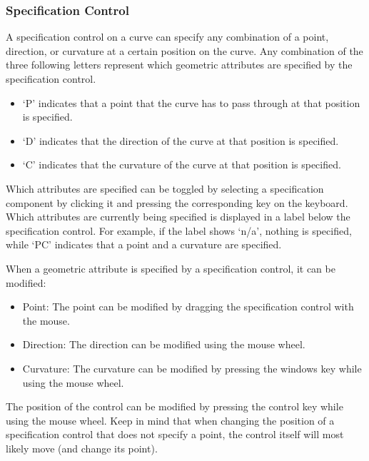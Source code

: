 \documentclass[a4paper]{article}
\begin{document}
				\subsubsection{Specification Control}
				\label{section:specification_control}
				
					A specification control on a curve can specify any combination of a point, direction, or curvature at a certain position on the curve. Any combination of the three following letters represent which geometric attributes are specified by the specification control. 
					
					\begin{itemize}
						\item `P' indicates that a point that the curve has to pass through at that position is specified.
						\item `D' indicates that the direction of the curve at that position is specified.
						\item `C' indicates that the curvature of the curve at that position is specified.
					\end{itemize}
					
					Which attributes are specified can be toggled by selecting a specification component by clicking it and pressing the corresponding key on the keyboard. Which attributes are currently being specified is displayed in a label below the specification control. For example, if the label shows `n/a', nothing is specified, while `PC' indicates that a point and a curvature are specified.
					
					When a geometric attribute is specified by a specification control, it can be modified:
					
					\begin{itemize}
						\item Point: The point can be modified by dragging the specification control with the mouse.
						\item Direction: The direction can be modified using the mouse wheel.
						\item Curvature: The curvature can be modified by pressing the windows key while using the mouse wheel.
					\end{itemize}
					
					The position of the control can be modified by pressing the control key while using the mouse wheel. Keep in mind that when changing the position of a specification control that does not specify a point, the control itself will most likely move (and change its point).
					
\end{document}
